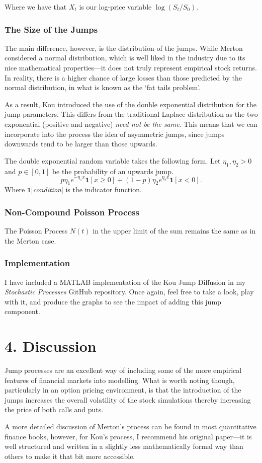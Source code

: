 \documentclass[11pt]{article}
\begin{document}
Where we have that $X_t$ is our log-price variable $\log(S_t/S_0)$. 

\subsubsection*{The Size of the Jumps}
The main difference, however, is the distribution of the jumps. While Merton considered a normal distribution, which is well liked in the industry due to its nice mathematical properties––it does not truly represent empirical stock returns. In reality, there is a higher chance of large losses than those predicted by the normal distribution, in what is known as the `fat tails problem'. 

As a result, Kou introduced the use of the double exponential distribution for the jump parameters. This differs from the traditional Laplace distribution as the two exponential (positive and negative) \textit{need not be the same}. This means that we can incorporate into the process the idea of asymmetric jumps, since jumps downwards tend to be larger than those upwards.

The double exponential random variable takes the following form. Let $\eta_1, \eta_2 >0$ and $p \in [0,1]$ be the probability of an upwards jump. 
\begin{equation}
    p \eta_1 e^{-\eta_1 x} \mathbf{1}[x \geq 0] + (1-p) \eta_2 e^{\eta_2 x} \mathbf{1}[x < 0].
\end{equation}
Where $\mathbf{1}$[\textit{condition}] is the indicator function.

\subsubsection*{Non-Compound Poisson Process}
The Poisson Process $N(t)$ in the upper limit of the sum remains the same as in the Merton case.

\subsubsection*{Implementation}
I have included a MATLAB implementation of the Kou Jump Diffusion in my \textit{Stochastic Processes} GitHub repository. Once again, feel free to take a look, play with it, and produce the graphs to see the impact of adding this jump component.

\section*{4. Discussion}
Jump processes are an excellent way of including some of the more empirical features of financial markets into modelling. What is worth noting though, particularly in an option pricing environment, is that the introduction of the jumps increases the overall volatility of the stock simulations thereby increasing the price of both calls and puts. 

A more detailed discussion of Merton's process can be found in most quantitative finance books, however, for Kou's process, I recommend his original paper––it is well structured and written in a slightly less mathematically formal way than others to make it that bit more accessible. 
\end{document}
